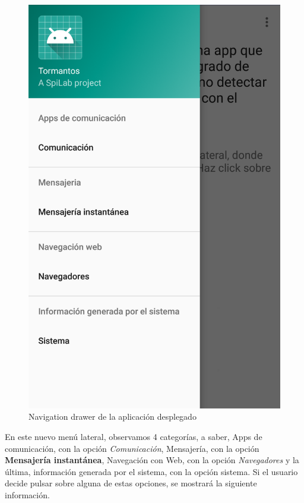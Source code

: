 \documentclass[12pt,a4paper,oneside]{book} %
\begin{document}
\begin{figure}[H]
	\begin{center}
     	\includegraphics[scale=0.2]{pictures/capsapp/navigation.png}
	    	\caption{Navigation drawer de la aplicación desplegado}
    	\label{fig:Navigation drawer de la aplicacion desplegado}
	\end{center}
\end{figure}
En este nuevo menú lateral, observamos 4 categorías, a saber, Apps de comunicación, con la opción \textit{Comunicación}, Mensajería, con la opción \textbf{Mensajería instantánea}, Navegación con Web, con la opción \textit{Navegadores} y la última, información generada por el sistema, con la opción sistema. 
\newline \newline 
Si el usuario decide pulsar sobre alguna de estas opciones, se mostrará la siguiente información. 
\end{document}
